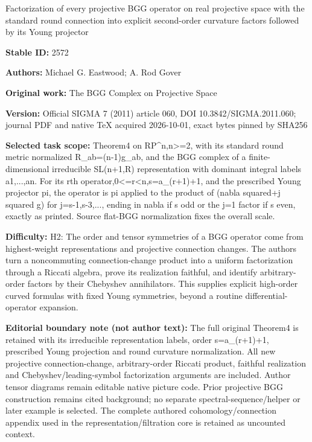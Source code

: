 \documentclass[11pt]{article}
\begin{document}
\begin{center}\Large Factorization of every projective BGG operator on real projective space with the standard round connection into explicit second-order curvature factors followed by its Young projector\end{center}
\noindent\textbf{Stable ID:} 2572\par
\noindent\textbf{Authors:} Michael G. Eastwood; A. Rod Gover\par
\noindent\textbf{Original work:} The BGG Complex on Projective Space\par
\noindent\textbf{Version:} Official SIGMA 7 (2011) article 060, DOI 10.3842/SIGMA.2011.060; journal PDF and native TeX acquired 2026-10-01, exact bytes pinned by SHA256\par
\noindent\textbf{Selected task scope:} Theorem4 on RP\textasciicircum{}n,n>=\allowbreak{}2, with its standard round metric normalized R\_ab=\allowbreak{}(n-1)g\_ab, and the BGG complex of a finite-dimensional irreducible SL(n+\allowbreak{}1,R) representation with dominant integral labels a1,...,an. For its rth operator,0<=\allowbreak{}r<n,s=\allowbreak{}a\_(r+\allowbreak{}1)+\allowbreak{}1, and the prescribed Young projector pi, the operator is pi applied to the product of (nabla squared+\allowbreak{}j squared g) for j=\allowbreak{}s-1,s-3,..., ending in nabla if s odd or the j=\allowbreak{}1 factor if s even, exactly as printed. Source flat-BGG normalization fixes the overall scale.\par
\noindent\textbf{Difficulty:} H2: The order and tensor symmetries of a BGG operator come from highest-weight representations and projective connection changes. The authors turn a noncommuting connection-change product into a uniform factorization through a Riccati algebra, prove its realization faithful, and identify arbitrary-order factors by their Chebyshev annihilators. This supplies explicit high-order curved formulas with fixed Young symmetries, beyond a routine differential-operator expansion.\par
\noindent\textbf{Editorial boundary note (not author text):} The full original Theorem4 is retained with its irreducible representation labels, order s=\allowbreak{}a\_(r+\allowbreak{}1)+\allowbreak{}1, prescribed Young projection and round curvature normalization. All new projective connection-change, arbitrary-order Riccati product, faithful realization and Chebyshev/leading-symbol factorization arguments are included. Author tensor diagrams remain editable native picture code. Prior projective BGG construction remains cited background; no separate spectral-sequence/helper or later example is selected. The complete authored cohomology/connection appendix used in the representation/filtration core is retained as uncounted context.\par
\end{document}
